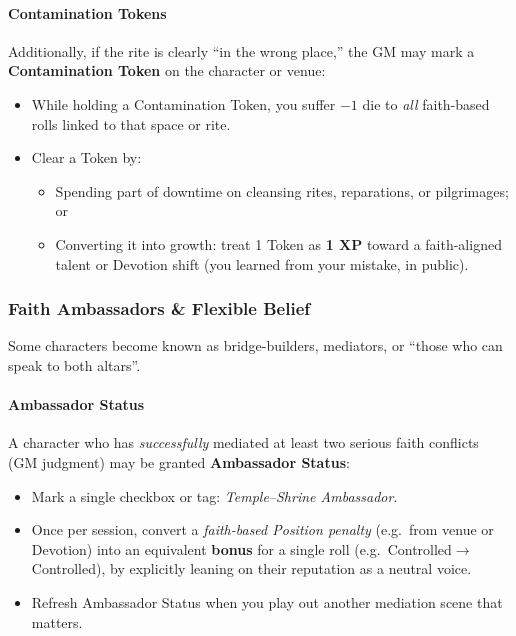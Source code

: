 \documentclass[11pt]{article}
\begin{document}
\paragraph*{Contamination Tokens}
Additionally, if the rite is clearly ``in the wrong place,'' the GM may mark a
\textbf{Contamination Token} on the character or venue:

\begin{itemize}
  \item While holding a Contamination Token, you suffer \(-1\) die to \emph{all} faith-based rolls
        linked to that space or rite.
  \item Clear a Token by:
        \begin{itemize}
          \item Spending part of downtime on cleansing rites, reparations, or pilgrimages; or
          \item Converting it into growth: treat 1 Token as \textbf{1 XP} toward a faith-aligned
                talent or Devotion shift (you learned from your mistake, in public).
        \end{itemize}
\end{itemize}

\subsubsection*{Faith Ambassadors \& Flexible Belief}

Some characters become known as bridge-builders, mediators, or ``those who can speak to both
altars''.

\paragraph*{Ambassador Status}
A character who has \emph{successfully} mediated at least two serious faith conflicts (GM
judgment) may be granted \textbf{Ambassador Status}:

\begin{itemize}
  \item Mark a single checkbox or tag: \emph{Temple--Shrine Ambassador}.
  \item Once per session, convert a \emph{faith-based Position penalty} (e.g.\ from venue or
        Devotion) into an equivalent \textbf{bonus} for a single roll (e.g.\ Controlled$\to$Controlled),
        by explicitly leaning on their reputation as a neutral voice.
  \item Refresh Ambassador Status when you play out another mediation scene that matters.
\end{itemize}
\end{document}
